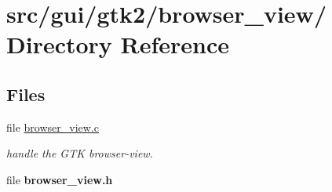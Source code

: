\hypertarget{dir_000014}{
\section{src/gui/gtk2/browser\_\-view/ Directory Reference}
\label{dir_000014}
}
\subsection*{Files}
\begin{CompactItemize}
\item 
file \hyperlink{browser__view_8c}{browser\_\-view.c}
\begin{CompactList}\small\item\em handle the GTK browser-view. \item\end{CompactList}

\item 
file {\bf browser\_\-view.h}
\end{CompactItemize}
